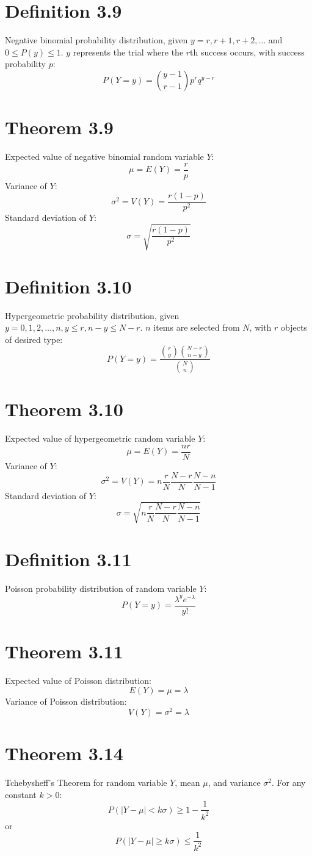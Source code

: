 \documentclass[12pt]{article}
\begin{document}
\section{Definition 3.9}
Negative binomial probability distribution, given $y = r, r+1, r+2, \ldots$ and $0 \leq P(y) \leq 1$. $y$ represents the trial where the $r$th success occurs, with success probability $p$:
\[
P(Y = y) = \binom{y-1}{r-1} p^r q^{y-r}
\]

\section{Theorem 3.9}
Expected value of negative binomial random variable $Y$:
\[
\mu = E(Y) = \frac{r}{p}
\]
Variance of $Y$:
\[
\sigma^2 = V(Y) = \frac{r(1-p)}{p^2}
\]
Standard deviation of $Y$:
\[
\sigma = \sqrt{\frac{r(1-p)}{p^2}}
\]

\section{Definition 3.10}
Hypergeometric probability distribution, given $y = 0, 1, 2, \ldots, n, y \leq r, n-y \leq N-r$. $n$ items are selected from $N$, with $r$ objects of desired type:
\[
P(Y = y) = \frac{\binom{r}{y}\binom{N-r}{n-y}}{\binom{N}{n}}
\]

\section{Theorem 3.10}
Expected value of hypergeometric random variable $Y$:
\[
\mu = E(Y) = \frac{nr}{N}
\]
Variance of $Y$:
\[
\sigma^2 = V(Y) = n \frac{r}{N}\frac{N-r}{N}\frac{N-n}{N-1}
\]
Standard deviation of $Y$:
\[
\sigma = \sqrt{n \frac{r}{N}\frac{N-r}{N}\frac{N-n}{N-1}}
\]

\section{Definition 3.11}
Poisson probability distribution of random variable $Y$:
\[
P(Y = y) = \frac{\lambda^y e^{-\lambda}}{y!}
\]

\section{Theorem 3.11}
Expected value of Poisson distribution:
\[
E(Y) = \mu = \lambda
\]
Variance of Poisson distribution:
\[
V(Y) = \sigma^2 = \lambda
\]

\section{Theorem 3.14}
Tchebysheff's Theorem for random variable $Y$, mean $\mu$, and variance $\sigma^2$. For any constant $k > 0$:
\[
P(|Y - \mu| < k\sigma) \geq 1 - \frac{1}{k^2}
\]
or
\[
P(|Y - \mu| \geq k\sigma) \leq \frac{1}{k^2}
\]
\end{document}
